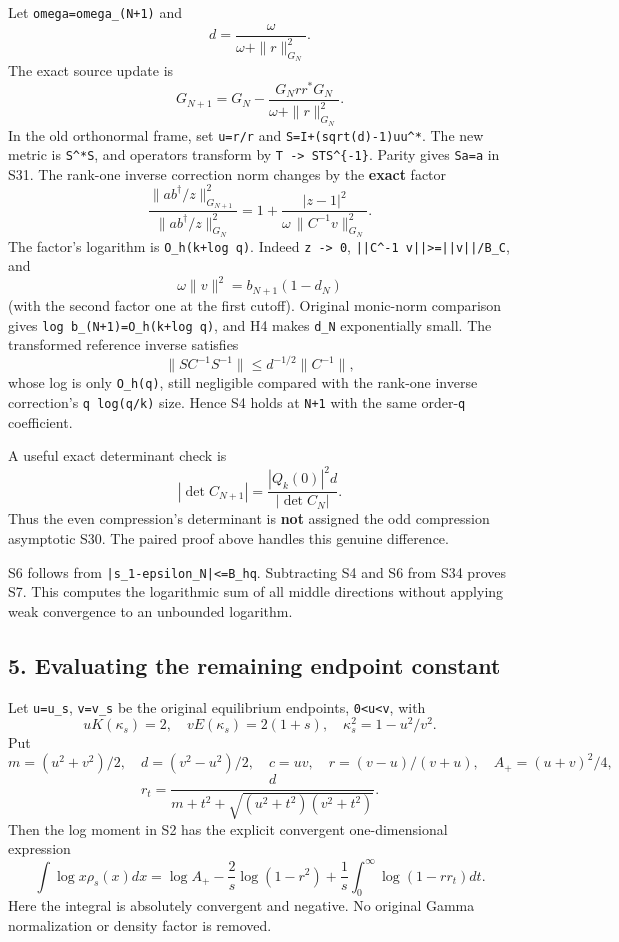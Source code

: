 \documentclass[11pt]{article}
\begin{document}
Let \nolinkurl{omega=omega_(N+1)} and \[
 d=\frac{\omega}{\omega+\|r\|_{G_N}^2}.
\] The exact source update is \[
 G_{N+1}=G_N-\frac{G_Nrr^*G_N}{\omega+\|r\|_{G_N}^2}.              \tag{S36}
\] In the old orthonormal frame, set \texttt{u=r/\textbar{}\textbar{}r\textbar{}\textbar{}} and \nolinkurl{S=I+(sqrt(d)-1)uu^*}. The new metric is \texttt{S\^{}*S}, and operators transform by \texttt{T\ -\textgreater{}\ STS\^{}\{-1\}}. Parity gives \texttt{Sa=a} in S31. The rank-one inverse correction norm changes by the \textbf{exact} factor \[
 \boxed{
 \frac{\|ab^\dagger/z\|_{G_{N+1}}^2}
      {\|ab^\dagger/z\|_{G_N}^2}
 =1+\frac{|z-1|^2}{\omega\,\|C^{-1}v\|_{G_N}^2}.}                \tag{S37}
\] The factor's logarithm is \texttt{O\_h(k+log\ q)}. Indeed \texttt{z\ -\textgreater{}\ 0}, \nolinkurl{||C^-1 v||>=||v||/B_C}, and \[
 \omega\|v\|^2=b_{N+1}(1-d_N)
\] (with the second factor one at the first cutoff). Original monic-norm comparison gives \nolinkurl{log b_(N+1)=O_h(k+log q)}, and H4 makes \texttt{d\_N} exponentially small. The transformed reference inverse satisfies \[
 \|SC^{-1}S^{-1}\|\le d^{-1/2}\|C^{-1}\|,
\] whose log is only \texttt{O\_h(q)}, still negligible compared with the rank-one inverse correction's \texttt{q\ log(q/k)} size. Hence S4 holds at \texttt{N+1} with the same order-\texttt{q} coefficient.

A useful exact determinant check is \[
 \boxed{|\det C_{N+1}|=\frac{|Q_k(0)|^2d}{|\det C_N|}.}           \tag{S38}
\] Thus the even compression's determinant is \textbf{not} assigned the odd compression asymptotic S30. The paired proof above handles this genuine difference.

S6 follows from \nolinkurl{|s_1-epsilon_N|<=B_hq}. Subtracting S4 and S6 from S34 proves S7. This computes the logarithmic sum of all middle directions without applying weak convergence to an unbounded logarithm.

\subsection{5. Evaluating the remaining endpoint constant}\label{evaluating-the-remaining-endpoint-constant}

Let \texttt{u=u\_s}, \texttt{v=v\_s} be the original equilibrium endpoints, \texttt{0\textless{}u\textless{}v}, with \[
 uK(\kappa_s)=2,\quad vE(\kappa_s)=2(1+s),\quad
 \kappa_s^2=1-u^2/v^2.
\] Put \[
 m=(u^2+v^2)/2,\quad d=(v^2-u^2)/2,\quad c=uv,\quad
 r=(v-u)/(v+u),\quad A_+=(u+v)^2/4,
\] \[
 r_t=\frac{d}{m+t^2+\sqrt{(u^2+t^2)(v^2+t^2)}}.
\] Then the log moment in S2 has the explicit convergent one-dimensional expression \[
 \boxed{\int\log x\rho_s(x)dx
 =\log A_+-\frac2s\log(1-r^2)
       +\frac1s\int_0^\infty\log(1-r r_t)dt.}                     \tag{S39}
\] Here the integral is absolutely convergent and negative. No original Gamma normalization or density factor is removed.
\end{document}
